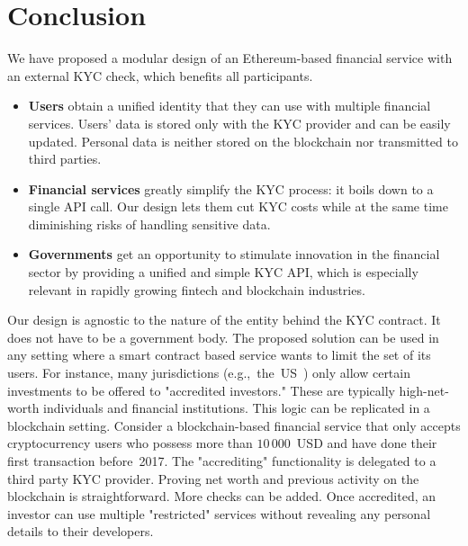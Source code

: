 \section{Conclusion}

We have proposed a modular design of an Ethereum-based financial service with an external KYC check, which benefits all participants.

\begin{itemize}
	\item \textbf{Users} obtain a unified identity that they can use with multiple financial services.
	Users' data is stored only with the KYC provider and can be easily updated.
	Personal data is neither stored on the blockchain nor transmitted to third parties.
	\item \textbf{Financial services} greatly simplify the KYC process: it boils down to a single API call.
	Our design lets them cut KYC costs while at the same time diminishing risks of handling sensitive data.
	\item \textbf{Governments} get an opportunity to stimulate innovation in the financial sector by providing a unified and simple KYC API, which is especially relevant in rapidly growing fintech and blockchain industries.
\end{itemize}

Our design is agnostic to the nature of the entity behind the KYC contract.
It does not have to be a government body.
The proposed solution can be used in any setting where a smart contract based service wants to limit the set of its users.
For instance, many jurisdictions (e.g.,~the~US~\cite{SEC}) only allow certain investments to be offered to "accredited investors."
These are typically high-net-worth individuals and financial institutions.
This logic can be replicated in a blockchain setting.
Consider a blockchain-based financial service that only accepts cryptocurrency users who possess more than $10\,000$~USD and have done their first transaction before~2017.
The "accrediting" functionality is delegated to a third party KYC provider.
Proving net worth and previous activity on the blockchain is straightforward.
More checks can be added.
Once accredited, an investor can use multiple "restricted" services without revealing any personal details to their developers.
